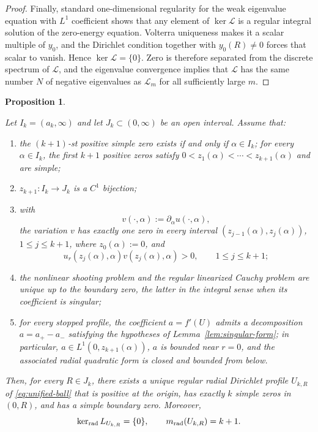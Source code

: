 \documentclass[11pt]{article}
\newtheorem{proposition}[theorem]{Proposition}
\begin{document}
\begin{proof}
{Finally, {standard one-dimensional regularity for the weak eigenvalue
equation with $L^1$ coefficient shows that} any element of
$\ker\mathcal L$ is a regular integral solution of the zero-energy equation.
Volterra uniqueness makes it a scalar multiple of $y_0$, and the Dirichlet
condition together with $y_0(R)\ne0$ forces that scalar to vanish.  Hence $\ker\mathcal L=\{0\}$.  Zero is therefore separated
from the discrete spectrum of $\mathcal L$, and the eigenvalue convergence
implies that $\mathcal L$ has the same number $N$ of negative eigenvalues as
$\mathcal L_m$ for all sufficiently large $m$.}
\end{proof}

\begin{proposition}\label{prop:zero-curve-principle}
{
Let $I_k=(a_k,\infty)$ and let $J_k\subset(0,\infty)$ be an open
interval.  Assume that:
\begin{enumerate}
\item {the $(k+1)$-st positive simple zero exists if and
only if $\alpha\in I_k$}; for every $\alpha\in I_k$, the first
$k+1$ positive zeros satisfy
$0<z_1(\alpha)<\cdots<z_{k+1}(\alpha)$ and are simple;
\item $z_{k+1}:I_k\to J_k$ is a $C^1$ bijection;
\item with
\[
 v(\cdot,\alpha):=\partial_\alpha u(\cdot,\alpha),
\]
the variation $v$ has exactly one zero in every interval
$(z_{j-1}(\alpha),z_j(\alpha))$, $1\le j\le k+1$, where
$z_0(\alpha):=0$, and
\begin{equation}\label{eq:positive}
 u_r(z_j(\alpha),\alpha)v(z_j(\alpha),\alpha)>0,
 \qquad 1\le j\le k+1;
\end{equation}
\item the nonlinear shooting problem and the regular linearized Cauchy
problem are unique up to the boundary zero, the latter in the integral
sense when its coefficient is singular;
\item {for every stopped profile, the coefficient
$a=f'(U)$ admits a decomposition $a=a_+-a_-$ satisfying the hypotheses of
Lemma~\ref{lem:singular-form}; in particular,
$a\in L^1(0,z_{k+1}(\alpha))$, $a$ is bounded near $r=0$, and the associated
radial quadratic form is closed and bounded from below.}
\end{enumerate}
Then, for every $R\in J_k$, there exists a unique regular radial
Dirichlet profile $U_{k,R}$ of \eqref{eq:unified-ball} that is positive
at the origin, has exactly $k$ simple zeros in $(0,R)$, and has a
simple boundary zero.  Moreover,
\[
 \ker_{\rm rad}L_{U_{k,R}}=\{0\},
 \qquad
 m_{\rm rad}(U_{k,R})=k+1.
\]
}
\end{proposition}
\end{document}
